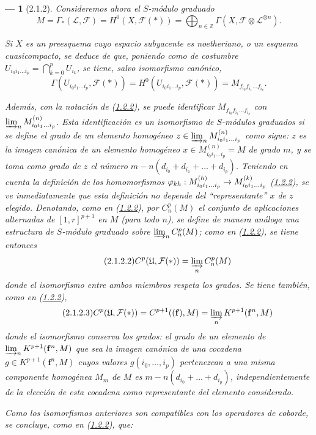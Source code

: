 \documentclass[10pt,oneside,openany]{book}
\theoremstyle{egaenv}\newtheorem*{env}{---}
\theoremstyle{egastatement}
\theoremstyle{egadescription}
\newcommand{\oldpage}[2][]{\marginnote{\normalfont\scriptsize\textbf{#1}\,|\,#2}\ignorespaces}
\renewcommand{\to}{\mathchoice{\longrightarrow}{\rightarrow}{\rightarrow}{\rightarrow}}
\begin{document}
\begin{env}[2.1.2]
\label{III.2.1.2}
\label{III.2.1.2-fr}
Consideremos ahora el $S$-módulo graduado 
\begin{equation}
\label{III.2.1.2.1-fr}
\tag{2.1.2.1}
M=\Gamma_*(\mathcal L,\mathcal F)
=H^0(X,\mathcal F(*))
=\bigoplus_{n\in\mathbb Z}
\Gamma(X,\mathcal F\otimes\mathcal L^{\otimes n}).
\end{equation}

\oldpage[III]{96}
Si $X$ es un preesquema cuyo espacio subyacente es noetheriano, o un esquema cuasicompacto, se deduce de  que, poniendo como de costumbre $U_{i_0i_1\ldots i_p}=\bigcap_{k=0}^pU_{i_k}$, se tiene, salvo isomorfismo canónico,
\[
\Gamma(U_{i_0i_1\ldots i_p},\mathcal F(*))
=H^0(U_{i_0i_1\ldots i_p},\mathcal F(*))
=M_{f_{i_0}f_{i_1}\ldots f_{i_p}}.
\]

Además, con la notación de (\hyperref[III.1.2.2]{1.2.2}), se puede identificar $M_{f_{i_0}f_{i_1}\ldots f_{i_p}}$ con $\varinjlim_n M_{i_0i_1\ldots i_p}^{(n)}$.
Esta identificación es un isomorfismo de $S$-módulos \emph{graduados} si se define el grado de un elemento homogéneo $z\in\varinjlim_n M_{i_0i_1\ldots i_p}^{(n)}$ como sigue: $z$ es la imagen canónica de un elemento homogéneo $x\in M_{i_0i_1\ldots i_p}^{(n)}=M$ de grado $m$, y se toma como grado de $z$ el número $m-n(d_{i_0}+d_{i_1}+\ldots+d_{i_p})$.
Teniendo en cuenta la definición de los homomorfismos $\varphi_{kh}:M_{i_0i_1\ldots i_p}^{(h)}\to
M_{i_0i_1\ldots i_p}^{(k)}$ (\hyperref[III.1.2.2]{1.2.2}), se ve inmediatamente que esta definición no depende del ``representante'' $x$ de $z$ elegido.
Denotando, como en (\hyperref[III.1.2.2]{1.2.2}), por $C_n^p(M)$ el conjunto de aplicaciones alternadas de $[1,r]^{p+1}$ en $M$ (para todo $n$), se define de manera análoga una estructura de $S$-módulo \emph{graduado} sobre $\varinjlim_n C_n^p(M)$; como en (\hyperref[III.1.2.2]{1.2.2}), se tiene entonces
\begin{equation}
\label{III.2.1.2.2-fr}
\tag{2.1.2.2}
C^p(\mathfrak U,\mathcal F(*))=\varinjlim_n C_n^p(M)
\end{equation}
donde el isomorfismo entre ambos miembros \emph{respeta los grados}.
Se tiene también, como en (\hyperref[III.1.2.2]{1.2.2}),
\begin{equation}
\label{III.2.1.2.3-fr}
\tag{2.1.2.3}
C^p(\mathfrak U,\mathcal F(*))
=C^{p+1}((\mathbf f),M)
=\varinjlim_n K^{p+1}(\mathbf f^n,M)
\end{equation}
donde el isomorfismo \emph{conserva los grados}: el grado de un elemento de $\varinjlim_n K^{p+1}(\mathbf f^n,M)$ que sea la imagen canónica de una cocadena $g\in K^{p+1}(\mathbf f^n,M)$ cuyos valores $g(i_0,\ldots,i_p)$ pertenezcan a una \emph{misma} componente homogénea $M_m$ de $M$ es $m-n(d_{i_0}+\ldots+d_{i_p})$, independientemente de la elección de esta cocadena como representante del elemento considerado.

Como los isomorfismos anteriores son compatibles con los operadores de coborde, se concluye, como en (\hyperref[III.1.2.2]{1.2.2}), que:
\end{env}
\end{document}
